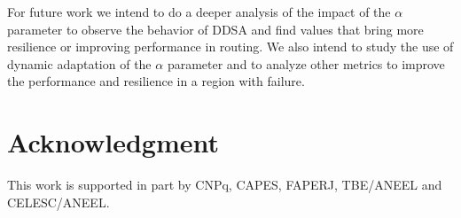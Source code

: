 \documentclass[conference]{IEEEtran}
\begin{document}
For future work we intend to do a deeper analysis of the impact of the $\alpha$ parameter to observe the behavior of DDSA and find values that bring more resilience or improving performance in routing. 
We also intend to study the use of dynamic adaptation of the $\alpha$ parameter and to analyze other metrics to improve the performance and resilience in a region with failure.



%



\section*{Acknowledgment}


This work is supported in part by CNPq, CAPES, FAPERJ, TBE/ANEEL and CELESC/ANEEL.


\ifCLASSOPTIONcaptionsoff
  \newpage
\fi



\end{document}
